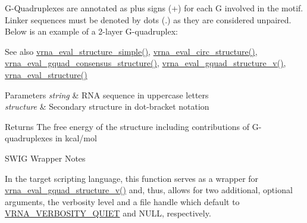 G-\/\+Quadruplexes are annotated as plus signs (\textquotesingle{}+\textquotesingle{}) for each G involved in the motif. Linker sequences must be denoted by dots (\textquotesingle{}.\textquotesingle{}) as they are considered unpaired. Below is an example of a 2-\/layer G-\/quadruplex\+: 
\begin{DoxyCode}{0}
\end{DoxyCode}


\begin{DoxySeeAlso}{See also}
\mbox{\hyperlink{group__eval_ga7e5273464b775d4130245681312c1369}{vrna\+\_\+eval\+\_\+structure\+\_\+simple()}}, \mbox{\hyperlink{group__eval_ga3e05a23ddf9b083f4e69881e440d4866}{vrna\+\_\+eval\+\_\+circ\+\_\+structure()}}, \mbox{\hyperlink{group__eval_gaf09a326b3d57a4b30c27bd0e216198ac}{vrna\+\_\+eval\+\_\+gquad\+\_\+consensus\+\_\+structure()}}, \mbox{\hyperlink{group__eval_gaeaa2bdbc1b5d78c667e735fbdff87fff}{vrna\+\_\+eval\+\_\+gquad\+\_\+structure\+\_\+v()}}, \mbox{\hyperlink{group__eval_ga58f199f1438d794a265f3b27fc8ea631}{vrna\+\_\+eval\+\_\+structure()}}
\end{DoxySeeAlso}

\begin{DoxyParams}{Parameters}
{\em string} & R\+NA sequence in uppercase letters \\
\hline
{\em structure} & Secondary structure in dot-\/bracket notation \\
\hline
\end{DoxyParams}
\begin{DoxyReturn}{Returns}
The free energy of the structure including contributions of G-\/quadruplexes in kcal/mol
\end{DoxyReturn}
\begin{DoxyRefDesc}{S\+W\+I\+G Wrapper Notes}
\item[\mbox{\hyperlink{wrappers__wrappers000055}{S\+W\+I\+G Wrapper Notes}}]In the target scripting language, this function serves as a wrapper for \mbox{\hyperlink{group__eval_gaeaa2bdbc1b5d78c667e735fbdff87fff}{vrna\+\_\+eval\+\_\+gquad\+\_\+structure\+\_\+v()}} and, thus, allows for two additional, optional arguments, the verbosity level and a file handle which default to \mbox{\hyperlink{group__eval_gaf4afe19780b61b4962c613bde324128b}{V\+R\+N\+A\+\_\+\+V\+E\+R\+B\+O\+S\+I\+T\+Y\+\_\+\+Q\+U\+I\+ET}} and N\+U\+LL, respectively. \end{DoxyRefDesc}
\mbox{\label{group__eval_ga9dba2fc5d7e6ad1359a7c2f350589c0e}} 
